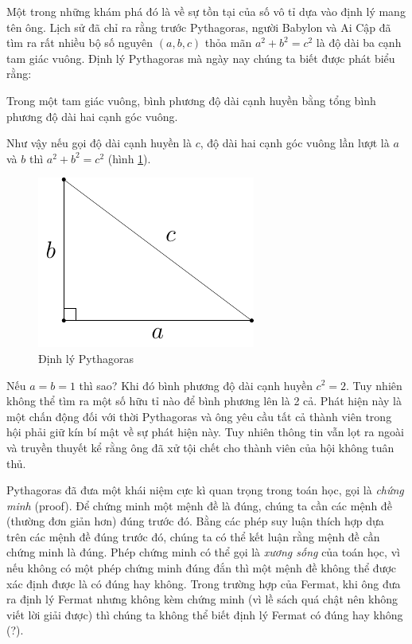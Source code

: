 Một trong những khám phá đó là về sự tồn tại của số vô tỉ dựa vào định lý mang tên ông. Lịch sử đã chỉ ra rằng trước Pythagoras, người Babylon và Ai Cập đã tìm ra rất nhiều bộ số nguyên $(a, b, c)$ thỏa mãn $a^2 + b^2 = c^2$ là độ dài ba cạnh tam giác vuông. Định lý Pythagoras mà ngày nay chúng ta biết được phát biểu rằng:

\begin{theorem}
    Trong một tam giác vuông, bình phương độ dài cạnh huyền bằng tổng bình phương độ dài hai cạnh góc vuông.
\end{theorem}

Như vậy nếu gọi độ dài cạnh huyền là $c$, độ dài hai cạnh góc vuông lần lượt là $a$ và $b$ thì $a^2 + b^2 = c^2$ (hình \ref{pythagoras1}).

\begin{figure}[ht]
	\centering
	\includegraphics{analytic_geometry/pythagoras1.pdf}
	\caption{Định lý Pythagoras}
	\label{pythagoras1}
\end{figure}

Nếu $a = b = 1$ thì sao? Khi đó bình phương độ dài cạnh huyền $c^2 = 2$. Tuy nhiên không thể tìm ra một số hữu tỉ nào để bình phương lên là 2 cả. Phát hiện này là một chấn động đối với thời Pythagoras và ông yêu cầu tất cả thành viên trong hội phải giữ kín bí mật về sự phát hiện này. Tuy nhiên thông tin vẫn lọt ra ngoài và truyền thuyết kể rằng ông đã xử tội chết cho thành viên của hội không tuân thủ.

Pythagoras đã đưa một khái niệm cực kì quan trọng trong toán học, gọi là \textit{chứng minh} (proof). Để chứng minh một mệnh đề là đúng, chúng ta cần các mệnh đề (thường đơn giản hơn) đúng trước đó. Bằng các phép suy luận thích hợp dựa trên các mệnh đề đúng trước đó, chúng ta có thể kết luận rằng mệnh đề cần chứng minh là đúng. Phép chứng minh có thể gọi là \textit{xương sống} của toán học, vì nếu không có một phép chứng minh đúng đắn thì một mệnh đề không thể được xác định được là có đúng hay không. Trong trường hợp của Fermat, khi ông đưa ra định lý Fermat nhưng không kèm chứng minh (vì lề sách quá chật nên không viết lời giải được) thì chúng ta không thể biết định lý Fermat có đúng hay không (?).

